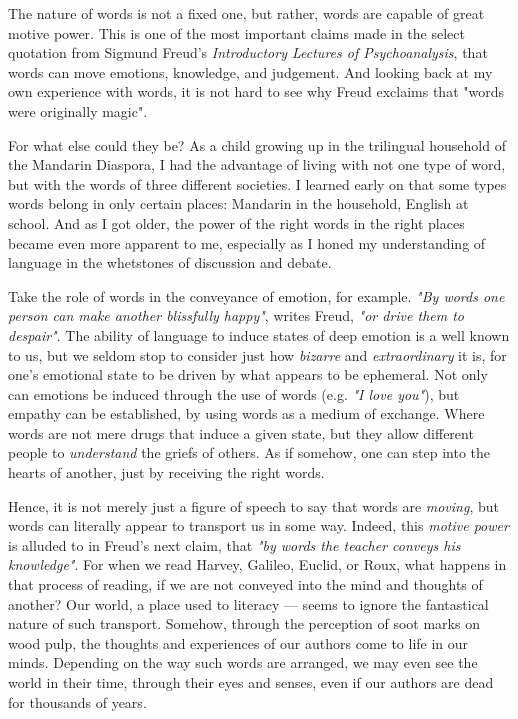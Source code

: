 The nature of words is not a fixed one, but rather, words are capable of great motive power. This is one of the most important claims made in the select quotation from Sigmund Freud's \emph{Introductory Lectures of Psychoanalysis}, that words can move emotions, knowledge, and judgement. And looking back at my own experience with words, it is not hard to see why Freud exclaims that "words were originally magic".

\noindent
For what else could they be? As a child growing up in the trilingual household of the Mandarin Diaspora, I had the advantage of living with not one type of word, but with the words of three different societies. I learned early on that some types words belong in only certain places: Mandarin in the household, English at school. And as I got older, the power of the right words in the right places became even more apparent to me, especially as I honed my understanding of language in the whetstones of discussion and debate.

Take the role of words in the conveyance of emotion, for example. \emph{"By words one person can make another blissfully happy"}, writes Freud, \emph{"or drive them to despair"}. The ability of language to induce states of deep emotion is a well known to us, but we seldom stop to consider just how \emph{bizarre} and \emph{extraordinary} it is, for one's emotional state to be driven by what appears to be ephemeral. Not only can emotions be induced through the use of words (e.g. \emph{"I love you"}), but empathy can be established, by using words as a medium of exchange. Where words are not mere drugs that induce a given state, but they allow different people to \emph{understand} the griefs of others. As if somehow, one can step into the hearts of another, just by receiving the right words.

Hence, it is not merely just a figure of speech to say that words are \emph{moving}, but words can literally appear to transport us in some way. Indeed, this \emph{motive power} is alluded to in Freud's next claim, that \emph{"by words the teacher \emph{conveys} his knowledge"}. For when we read Harvey, Galileo, Euclid, or Roux, what happens in that process of reading, if we are not conveyed into the mind and thoughts of another? Our world, a place used to literacy --- seems to ignore the fantastical nature of such transport. Somehow, through the perception of soot marks on wood pulp, the thoughts and experiences of our authors come to life in our minds. Depending on the way such words are arranged, we may even see the world in their time, through their eyes and senses, even if our authors are dead for thousands of years.

